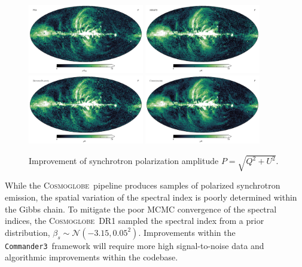 \documentclass[twocolumn]{../../common/aa}
\def\commanderthree{\texttt{Commander3}}
\newcommand{\cosmoglobe}{\textsc{Cosmoglobe}}
\begin{document}
\begin{figure}
	\centering
	\includegraphics[width=0.45\textwidth]{figures/polint_PR4.pdf}
	\includegraphics[width=0.45\textwidth]{figures/polint_WMAP9.pdf}
	\includegraphics[width=0.45\textwidth]{figures/polint_BP.pdf}
	\includegraphics[width=0.45\textwidth]{figures/polint_CG.pdf}
	\caption{
		Improvement of synchrotron polarization amplitude $P=\sqrt{Q^2+U^2}$.
		}
       \label{fig:synch_polint}
\end{figure}

While the \cosmoglobe\ pipeline produces samples of polarized synchrotron emission, the spatial variation of the spectral index is poorly determined within the Gibbs chain. To mitigate the poor MCMC convergence of the spectral indices, the \cosmoglobe\ DR1 sampled the spectral index from a prior distribution, $\beta_s\sim\mathcal N(-3.15, 0.05^2)$. Improvements within the \commanderthree\ framework will require more high signal-to-noise data and algorithmic improvements within the codebase.
\end{document}
